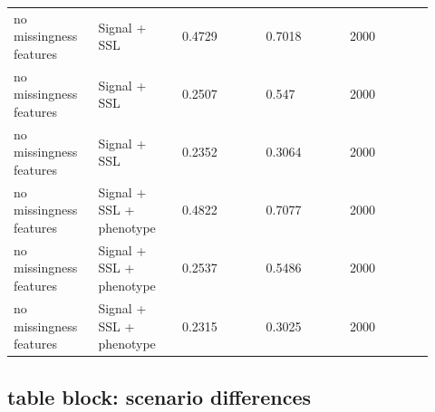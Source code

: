 \documentclass[11pt]{article}
\begin{document}
\begin{landscape}
\begin{longtable}{L{0.184\linewidth} L{0.184\linewidth} L{0.184\linewidth} L{0.184\linewidth} L{0.184\linewidth}}
no missingness features & Signal + SSL & 0.\allowbreak{}4729 & 0.\allowbreak{}7018 & 2000 \\
no missingness features & Signal + SSL & 0.\allowbreak{}2507 & 0.\allowbreak{}547 & 2000 \\
no missingness features & Signal + SSL & 0.\allowbreak{}2352 & 0.\allowbreak{}3064 & 2000 \\
no missingness features & Signal + SSL + phenotype & 0.\allowbreak{}4822 & 0.\allowbreak{}7077 & 2000 \\
no missingness features & Signal + SSL + phenotype & 0.\allowbreak{}2537 & 0.\allowbreak{}5486 & 2000 \\
no missingness features & Signal + SSL + phenotype & 0.\allowbreak{}2315 & 0.\allowbreak{}3025 & 2000 \\
\end{longtable}
\normalsize
\end{landscape}


\subsection*{table block: scenario differences}
\end{document}
